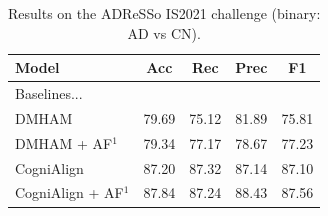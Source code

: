 \documentclass{Odyssey2026}
\begin{document}
\begin{table}[h]
    \centering
    \caption{Results on the ADReSSo IS2021 challenge (binary: AD vs CN).}
    \begin{tabular}{lcccc}
        \toprule
        \textbf{Model} & \textbf{Acc} & \textbf{Rec} & \textbf{Prec} & \textbf{F1} \\
        \midrule
        Baselines... & & & & \\
        DMHAM           & 79.69 & 75.12 & 81.89 & 75.81 \\
        DMHAM + AF$^1$  & 79.34 & 77.17 & 78.67 & 77.23 \\
        CogniAlign        & 87.20 & 87.32 & 87.14 & 87.10 \\
        CogniAlign + AF$^1$ & 87.84 & 87.24 & 88.43 & 87.56 \\
        \bottomrule
    \end{tabular}
\end{table}
\end{document}
